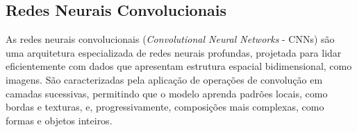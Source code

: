 \documentclass[12pt]{article}
\begin{document}

\subsection{Redes Neurais Convolucionais}
\label{sec:review:cnn}

As redes neurais convolucionais (\emph{Convolutional Neural Networks} - CNNs) são uma arquitetura especializada de redes neurais profundas, projetada para lidar eficientemente com dados que apresentam estrutura espacial bidimensional, como imagens. \cite{lecun1998gradient} São caracterizadas pela aplicação de operações de convolução em camadas sucessivas, permitindo que o modelo aprenda padrões locais, como bordas e texturas, e, progressivamente, composições mais complexas, como formas e objetos inteiros.
\end{document}

